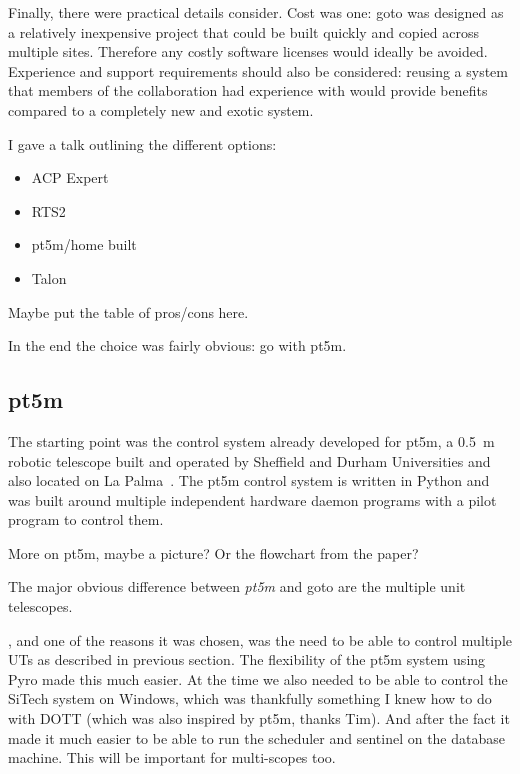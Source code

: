 \begin{colsection}
\begin{colsection}
Finally, there were practical details consider. Cost was one: \gls{goto} was designed as a relatively inexpensive project that could be built quickly and copied across multiple sites. Therefore any costly software licenses would ideally be avoided. Experience and support requirements should also be considered: reusing a system that members of the collaboration had experience with would provide benefits compared to a completely new and exotic system.


I gave a talk outlining the different options:
\begin{itemize}
    \item ACP Expert
    \item RTS2
    \item pt5m/home built
    \item Talon
\end{itemize}

Maybe put the table of pros/cons here.

In the end the choice was fairly obvious: go with pt5m.

\end{colsection}


\subsection{pt5m}
\label{sec:pt5m}
\begin{colsection}

The starting point was the control system already developed for pt5m, a \SI{0.5}{\metre} robotic telescope built and operated by Sheffield and Durham Universities and also located on La Palma~\citep{pt5m}. The pt5m control system is written in Python and was built around multiple independent hardware daemon programs with a pilot program to control them.

More on pt5m, maybe a picture? Or the flowchart from the paper?


The major obvious difference between \textit{pt5m} and \gls{goto} are the multiple unit telescopes.

, and one of the reasons it was chosen, was the need to be able to control multiple UTs as described in previous section. The flexibility of the pt5m system using Pyro made this much easier. At the time we also needed to be able to control the SiTech system on Windows, which was thankfully something I knew how to do with DOTT (which was also inspired by pt5m, thanks Tim). And after the fact it made it much easier to be able to run the scheduler and sentinel on the database machine. This will be important for multi-scopes too.

\end{colsection}


\end{colsection}

